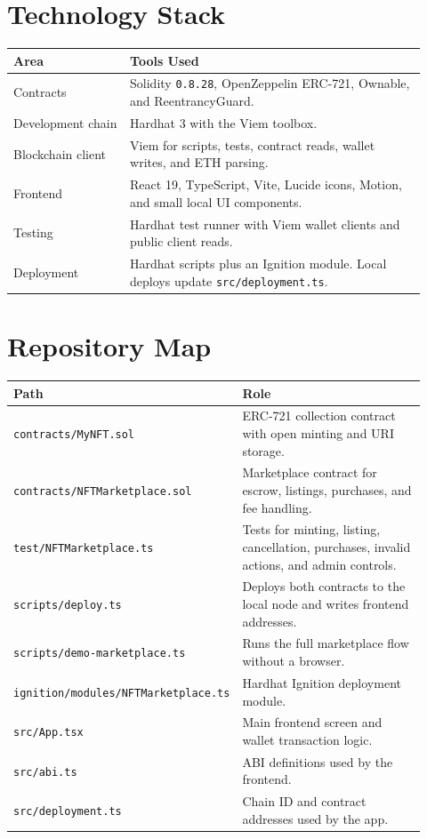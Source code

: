 \documentclass[11pt,a4paper]{article}
\newcommand{\code}[1]{\texttt{#1}}
\begin{document}
\section{Technology Stack}

\begin{longtable}{p{0.26\linewidth} p{0.66\linewidth}}
\toprule
\textbf{Area} & \textbf{Tools Used} \\
\midrule
\endhead
Contracts & Solidity \code{0.8.28}, OpenZeppelin ERC-721, Ownable, and ReentrancyGuard. \\
Development chain & Hardhat 3 with the Viem toolbox. \\
Blockchain client & Viem for scripts, tests, contract reads, wallet writes, and ETH parsing. \\
Frontend & React 19, TypeScript, Vite, Lucide icons, Motion, and small local UI components. \\
Testing & Hardhat test runner with Viem wallet clients and public client reads. \\
Deployment & Hardhat scripts plus an Ignition module. Local deploys update \code{src/deployment.ts}. \\
\bottomrule
\end{longtable}

\section{Repository Map}

\begin{longtable}{p{0.33\linewidth} p{0.59\linewidth}}
\toprule
\textbf{Path} & \textbf{Role} \\
\midrule
\endhead
\code{contracts/MyNFT.sol} & ERC-721 collection contract with open minting and URI storage. \\
\code{contracts/NFTMarketplace.sol} & Marketplace contract for escrow, listings, purchases, and fee handling. \\
\code{test/NFTMarketplace.ts} & Tests for minting, listing, cancellation, purchases, invalid actions, and admin controls. \\
\code{scripts/deploy.ts} & Deploys both contracts to the local node and writes frontend addresses. \\
\code{scripts/demo-marketplace.ts} & Runs the full marketplace flow without a browser. \\
\code{ignition/modules/NFTMarketplace.ts} & Hardhat Ignition deployment module. \\
\code{src/App.tsx} & Main frontend screen and wallet transaction logic. \\
\code{src/abi.ts} & ABI definitions used by the frontend. \\
\code{src/deployment.ts} & Chain ID and contract addresses used by the app. \\
\bottomrule
\end{longtable}
\end{document}
